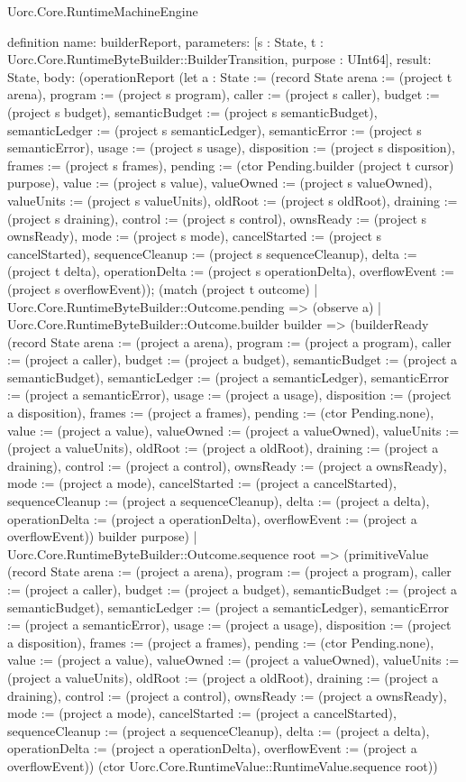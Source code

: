 \begin{lexlean}{Uorc.Core.RuntimeMachineEngine}
\begin{semanticmodule}
definition{
  name: builderReport,
  parameters: [s : State, t : Uorc.Core.RuntimeByteBuilder::BuilderTransition, purpose : UInt64],
  result: State,
  body: (operationReport (let a : State := (record State {arena := (project t arena), program := (project s program), caller := (project s caller), budget := (project s budget), semanticBudget := (project s semanticBudget), semanticLedger := (project s semanticLedger), semanticError := (project s semanticError), usage := (project s usage), disposition := (project s disposition), frames := (project s frames), pending := (ctor Pending.builder (project t cursor) purpose), value := (project s value), valueOwned := (project s valueOwned), valueUnits := (project s valueUnits), oldRoot := (project s oldRoot), draining := (project s draining), control := (project s control), ownsReady := (project s ownsReady), mode := (project s mode), cancelStarted := (project s cancelStarted), sequenceCleanup := (project s sequenceCleanup), delta := (project t delta), operationDelta := (project s operationDelta), overflowEvent := (project s overflowEvent)}); (match (project t outcome)
    | Uorc.Core.RuntimeByteBuilder::Outcome.pending => (observe a)
    | Uorc.Core.RuntimeByteBuilder::Outcome.builder builder => (builderReady (record State {arena := (project a arena), program := (project a program), caller := (project a caller), budget := (project a budget), semanticBudget := (project a semanticBudget), semanticLedger := (project a semanticLedger), semanticError := (project a semanticError), usage := (project a usage), disposition := (project a disposition), frames := (project a frames), pending := (ctor Pending.none), value := (project a value), valueOwned := (project a valueOwned), valueUnits := (project a valueUnits), oldRoot := (project a oldRoot), draining := (project a draining), control := (project a control), ownsReady := (project a ownsReady), mode := (project a mode), cancelStarted := (project a cancelStarted), sequenceCleanup := (project a sequenceCleanup), delta := (project a delta), operationDelta := (project a operationDelta), overflowEvent := (project a overflowEvent)}) builder purpose)
    | Uorc.Core.RuntimeByteBuilder::Outcome.sequence root => (primitiveValue (record State {arena := (project a arena), program := (project a program), caller := (project a caller), budget := (project a budget), semanticBudget := (project a semanticBudget), semanticLedger := (project a semanticLedger), semanticError := (project a semanticError), usage := (project a usage), disposition := (project a disposition), frames := (project a frames), pending := (ctor Pending.none), value := (project a value), valueOwned := (project a valueOwned), valueUnits := (project a valueUnits), oldRoot := (project a oldRoot), draining := (project a draining), control := (project a control), ownsReady := (project a ownsReady), mode := (project a mode), cancelStarted := (project a cancelStarted), sequenceCleanup := (project a sequenceCleanup), delta := (project a delta), operationDelta := (project a operationDelta), overflowEvent := (project a overflowEvent)}) (ctor Uorc.Core.RuntimeValue::RuntimeValue.sequence root))
}
\end{semanticmodule}
\end{lexlean}
